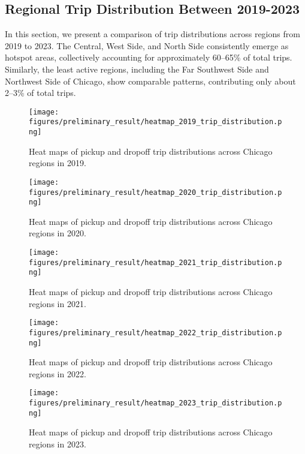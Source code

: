 \subsection{Regional Trip Distribution Between 2019-2023}
In this section, we present a comparison of trip distributions across regions from 2019 to 2023. The Central, West Side, and North Side consistently emerge as hotspot areas, collectively accounting for approximately 60--65\% of total trips. Similarly, the least active regions, including the Far Southwest Side and Northwest Side of Chicago, show comparable patterns, contributing only about 2--3\% of total trips.
\begin{figure}[h]
  \centering
\label{distribution_2019}
  \texttt{[image: figures/preliminary\_result/heatmap\_2019\_trip\_distribution.png]}
\caption{Heat maps of pickup and dropoff trip distributions across Chicago regions in 2019.}
\end{figure}

\begin{figure}[h]
  \centering
\label{distribution_2020}
  \texttt{[image: figures/preliminary\_result/heatmap\_2020\_trip\_distribution.png]}
\caption{Heat maps of pickup and dropoff trip distributions across Chicago regions in 2020.}
\end{figure}

\begin{figure}[h]
  \centering
\label{distribution_2021}
  \texttt{[image: figures/preliminary\_result/heatmap\_2021\_trip\_distribution.png]}
\caption{Heat maps of pickup and dropoff trip distributions across Chicago regions in 2021.}
\end{figure}

\begin{figure}[h]
  \centering
\label{distribution_2022}
  \texttt{[image: figures/preliminary\_result/heatmap\_2022\_trip\_distribution.png]}
\caption{Heat maps of pickup and dropoff trip distributions across Chicago regions in 2022.}
\end{figure}

\begin{figure}[h]
  \centering
\label{distribution_2023}
  \texttt{[image: figures/preliminary\_result/heatmap\_2023\_trip\_distribution.png]}
\caption{Heat maps of pickup and dropoff trip distributions across Chicago regions in 2023.}
\end{figure}

\newpage

